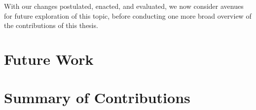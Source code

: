 With our changes postulated, enacted, and evaluated, we now consider avenues
for future exploration of this topic, before conducting one more broad overview of
the contributions of this thesis.

\section{Future Work}



\section{Summary of Contributions}


